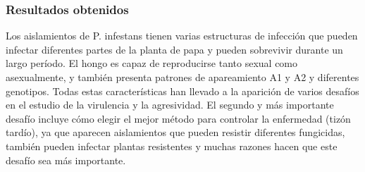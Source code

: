\subsubsection{Resultados obtenidos}

Los aislamientos de P. infestans tienen varias estructuras de infección que pueden infectar diferentes partes de la planta de papa y pueden sobrevivir durante un largo período. El hongo es capaz de reproducirse tanto sexual como asexualmente, y también presenta patrones de apareamiento A1 y A2 y diferentes genotipos. Todas estas características han llevado a la aparición de varios desafíos en el estudio de la virulencia y la agresividad. El segundo y más importante desafío incluye cómo elegir el mejor método para controlar la enfermedad (tizón tardío), ya que aparecen aislamientos que pueden resistir diferentes fungicidas, también pueden infectar plantas resistentes y muchas razones hacen que este desafío sea más importante.










